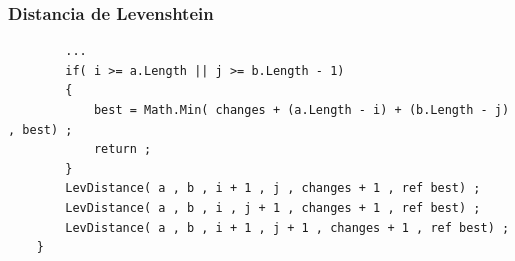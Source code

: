 \documentclass{beamer}
\begin{document}
\begin{frame}[fragile]
    \frametitle{Distancia de Levenshtein}
    \begin{lstlisting}
        ...
        if( i >= a.Length || j >= b.Length - 1)
        {
            best = Math.Min( changes + (a.Length - i) + (b.Length - j) , best) ;
            return ;
        }
        LevDistance( a , b , i + 1 , j , changes + 1 , ref best) ;
        LevDistance( a , b , i , j + 1 , changes + 1 , ref best) ;
        LevDistance( a , b , i + 1 , j + 1 , changes + 1 , ref best) ;
    }
    \end{lstlisting}
    

\end{frame}
\end{document}
